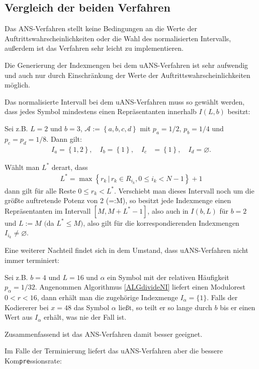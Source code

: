 \documentclass[a4paper,12pt]{article}
\newcommand{\A}{\mathcal A}
\newcounter{Algorithmus}
\begin{document}
\subsection{Vergleich der beiden Verfahren}
Das ANS-Verfahren stellt keine Bedingungen an die Werte der Auftrittswahrscheinlichkeiten oder die Wahl des normalisierten Intervalls, außerdem ist das Verfahren sehr leicht zu implementieren.
\par
Die Generierung der Indexmengen bei dem uANS-Verfahren ist sehr aufwendig und auch nur durch Einschränkung der Werte der Auftrittswahrscheinlichkeiten möglich.
\par
Das normalisierte Intervall bei dem uANS-Verfahren muss so gewählt werden, dass jedes Symbol mindestens einen Repräsentanten innerhalb  
$I(L,b)$ besitzt:
\par
Sei z.B. $L=2$ und $b=3$, $\A:=\left\{a, b, c, d\right\}$ mit $p_{a}=1/2$, $p_{b}=1/4$ und $p_{c}=p_{d}=1/8$. 
Dann gilt:
\begin{align*}
I_{a}=\left\{1,2\right\},\quad  I_{b}=\left\{1\right\},\quad I_{c}&=\left\{1\right\},\quad I_{d}=\varnothing.
\end{align*}
\par
Wählt man $L^{*}$ derart, dass 
\begin{align*}
L^{*} = \max \left\{r_{k}\,|\,r_{k}\in R_{i_{k}}, 0\leq i_{k} < N-1\right\} +1
\end{align*} 
dann gilt für alle Reste $0 \leq r_{k} < L^{*}$. Verschiebt man dieses Intervall noch um die größte auftretende Potenz von 2 (=:M), so besitzt jede Indexmenge einen Repräsentanten im Intervall $[M,M + L^{*}-1]$, also auch in $I(b,L)$ für $b=2$ und $L:=M$ $($da $L^{*} \leq M)$, also gilt für die korrespondierenden Indexmengen $I_{i_{k}} \neq \varnothing$.
\par
Eine weiterer Nachteil findet sich in dem Umstand, dass uANS-Verfahren nicht immer terminiert:
\par
Sei z.B. $b=4$ und $L=16$ und $\alpha$ ein Symbol mit der relativen Häufigkeit $p_{\alpha}=1/32$. Angenommen Algorithmus \ref{ALGdivideNI} liefert einen Modulorest $0 < r < 16$, dann erhält man die zugehörige Indexmenge $I_{\alpha}=\{1\}$. Falls der Kodiererer bei  $x=48$ das Symbol $\alpha$ ließt, so teilt er so lange durch $b$ bis er einen Wert aus $I_{\alpha}$ erhält, was nie der Fall ist.
\par
Zusammenfassend ist das ANS-Verfahren damit besser geeignet. 
\par
Im Falle der Terminierung liefert das uANS-Verfahren  aber die bessere Kom{\tt{pre}}ssionsrate:
\end{document}
